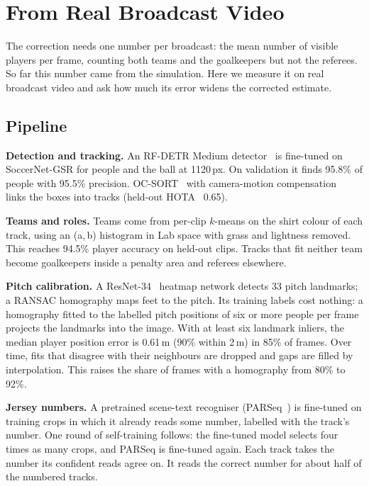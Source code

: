 \documentclass[runningheads]{llncs}
\begin{document}
\section{From Real Broadcast Video}
\label{sec:video}

The correction needs one number per broadcast: the mean number of visible players per frame, counting both teams and
the goalkeepers but not the referees. So far this number came from the simulation. Here we measure it on real
broadcast video and ask how much its error widens the corrected estimate.

\subsection{Pipeline}

\textbf{Detection and tracking.} An RF-DETR Medium detector~\cite{rfdetr} is fine-tuned on SoccerNet-GSR for people
and the ball at 1120\,px. On validation it finds 95.8\% of people with 95.5\% precision. OC-SORT~\cite{cao2023ocsort}
with camera-motion compensation~\cite{trackers} links the boxes into tracks (held-out HOTA~\cite{luiten2021hota} 0.65).

\textbf{Teams and roles.} Teams come from per-clip $k$-means on the shirt colour of each track, using an (a,\,b)
histogram in Lab space with grass and lightness removed. This reaches 94.5\% player accuracy on held-out clips.
Tracks that fit neither team become goalkeepers inside a penalty area and referees elsewhere.

\textbf{Pitch calibration.} A ResNet-34~\cite{he2016resnet} heatmap network detects 33 pitch landmarks; a RANSAC
homography maps feet to the pitch. Its training labels cost nothing: a homography fitted to the labelled pitch
positions of six or more people per frame projects the landmarks into the image. With at least six landmark inliers,
the median player position error is 0.61\,m (90\% within 2\,m) in 85\% of frames. Over time, fits that disagree with
their neighbours are dropped and gaps are filled by interpolation. This raises the share of frames with a homography
from 80\% to 92\%.

\textbf{Jersey numbers.} A pretrained scene-text recogniser (PARSeq~\cite{bautista2022parseq}) is fine-tuned on
training crops in which it already reads some number, labelled with the track's number. One round of self-training
follows: the fine-tuned model selects four times as many crops, and PARSeq is fine-tuned again. Each track takes the
number its confident reads agree on. It reads the correct number for about half of the numbered tracks.
\end{document}
